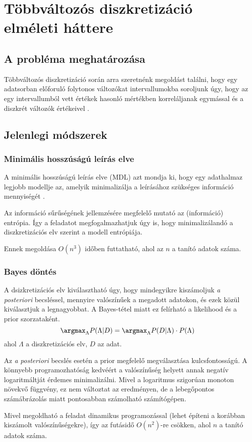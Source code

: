 \chapter{Többváltozós diszkretizáció elméleti háttere}

\section{A probléma meghatározása}
Többváltozós diszkretizáció során arra szeretnénk megoldást találni, hogy egy adatsorban előforuló folytonos változókat intervallumokba soroljunk úgy, hogy az egy intervallumból vett értékek hasonló mértékben korreláljanak egymással és a diszkrét változók értékeivel \cite{monti2013multivariate}.

\section{Jelenlegi módszerek}
\subsection{Minimális hosszúságú leírás elve}
A minimális hosszúságú leírás elve (MDL) azt mondja ki, hogy egy adathalmaz legjobb modellje az, amelyik minimalizálja a leírásához szükséges információ mennyiségét \cite{friedman1996discretizing}.

Az információ sűrűségének jellemzésére megfelelő mutató az (információ) entrópia. Így a feladatot megfogalmazhatjuk úgy is, hogy minimalizálandó a diszkretizációs elv szerint a modell entrópiája.

Ennek megoldása $O(n^3)$ időben futtatható, ahol az $n$ a tanító adatok száma. 

\subsection{Bayes döntés}
A dsizkretizációs elv kiválasztható úgy, hogy mindegyikre kiszámoljuk \textit{a posteriori} becsléssel, mennyire valószínűek a megadott adatokon, és ezek közül kiválasztjuk a legnagyobbat. A Bayes-tétel miatt ez felírható a likelihood és a prior szorzataként.
$$ \argmax_{\Lambda}{P(\Lambda | D)} = 
\argmax_{\Lambda}{P(D | \Lambda) \cdot P(\Lambda)} $$
ahol $\Lambda$ a diszkretizációs elv, $D$ az adat.

Az \textit{a posteriori} becslés esetén a prior megfelelő megválasztása kulcsfontosságú. A könnyebb programozhatóság kedvéért a valószínűség helyett annak negatív logaritmáltját érdemes minimalizálni. Mivel a logaritmus szigorúan monoton növekvő függvény, ez nem változtat az eredményen, de a lebegőpontos számábrázolás miatt pontosabban számolható számítógépen.

Mivel megoldható a feladat dinamikus programozással (lehet építeni a korábban kiszámolt valószínűségekre), így az futásidő $O(n^2)$-re csökken, ahol $n$ a tanító adatok száma.

